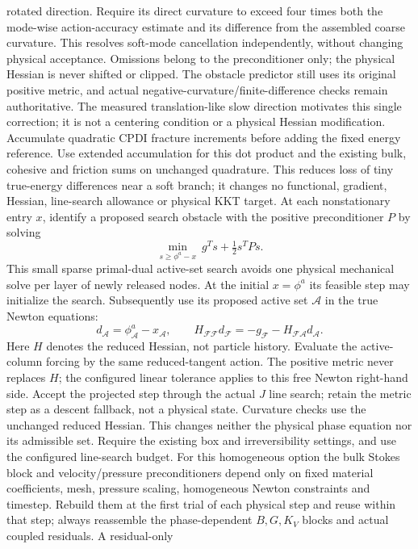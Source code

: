 \documentclass[11pt]{article}
\begin{document}
rotated direction. Require its direct curvature to exceed four times both the
mode-wise action-accuracy estimate and its difference from the assembled
coarse curvature. This resolves soft-mode cancellation independently, without
changing physical acceptance. Omissions belong to the preconditioner only;
the physical Hessian is never shifted or
clipped. The obstacle predictor still uses its original positive metric,
and actual negative-curvature/finite-difference checks remain authoritative.
The measured translation-like slow direction motivates this single correction;
it is not a centering condition or a physical Hessian modification.
Accumulate quadratic CPDI fracture increments before adding the fixed energy
reference. Use extended accumulation for this dot product and the existing bulk,
cohesive and friction sums on unchanged quadrature. This reduces loss of tiny
true-energy differences near a soft branch; it changes no functional, gradient,
Hessian, line-search allowance or physical KKT target.
At each nonstationary entry $x$, identify a proposed search obstacle with the
positive preconditioner $P$ by solving
\[
 \min_{s\ge\phi^a-x}\ g^Ts+\tfrac12 s^TPs .
\]
This small sparse primal-dual active-set search avoids one physical mechanical
solve per layer of newly released nodes. At the initial $x=\phi^a$ its feasible
step may initialize the search. Subsequently use its proposed active set
$\mathcal A$ in the true Newton equations:
\[
 d_{\mathcal A}=\phi^a_{\mathcal A}-x_{\mathcal A},\qquad
 H_{\mathcal F\mathcal F}d_{\mathcal F}
 =-g_{\mathcal F}-H_{\mathcal F\mathcal A}d_{\mathcal A}.
\]
Here $H$ denotes the reduced Hessian, not particle history.
Evaluate the active-column forcing by the same reduced-tangent action. The
positive metric never replaces $H$; the configured linear tolerance applies
to this free Newton right-hand side. Accept the projected step through the
actual $J$ line search; retain the metric step as a descent fallback, not a
physical state. Curvature checks use the unchanged reduced Hessian. This changes neither the
physical phase equation nor its admissible set. Require the existing box and
irreversibility settings, and use the configured line-search budget.
For this homogeneous option the bulk Stokes block and velocity/pressure
preconditioners depend only on fixed material coefficients, mesh, pressure
scaling, homogeneous Newton constraints and timestep. Rebuild them at the
first trial of each physical step and reuse within that step; always reassemble
the phase-dependent $B,G,K_V$ blocks and actual coupled residuals. A residual-only
\end{document}
